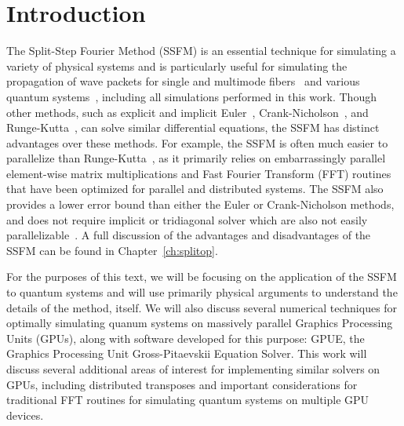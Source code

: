 \section*{Introduction}
The Split-Step Fourier Method (SSFM) is an essential technique for simulating a variety of physical systems and is particularly useful for simulating the propagation of wave packets for single and multimode fibers~\cite{agrawal2000, sinkin2003, meirelles2005, min2003} and various quantum systems~\cite{bayindir2015, weideman1986, wang2005}, including all simulations performed in this work.
Though other methods, such as explicit and implicit Euler~\cite{butcher2016}, Crank-Nicholson~\cite{crank1947}, and Runge-Kutta~\cite{butcher2016}, can solve similar differential equations, the SSFM has distinct advantages over these methods.
For example, the SSFM is often much easier to parallelize than Runge-Kutta~\cite{brehler2017}, as it primarily relies on embarrassingly parallel element-wise matrix multiplications and Fast Fourier Transform (FFT) routines that have been optimized for parallel and distributed systems.
The SSFM also provides a lower error bound than either the Euler or Crank-Nicholson methods, and does not require implicit or tridiagonal solver \cite{conte2017, thomas1949} which are also not easily parallelizable~\cite{goddeke2010, wang1981, sweet1977}.
A full discussion of the advantages and disadvantages of the SSFM can be found in Chapter~\ref{ch:splitop}.

For the purposes of this text, we will be focusing on the application of the SSFM to quantum systems and will use primarily physical arguments to understand the details of the method, itself.
We will also discuss several numerical techniques for optimally simulating quanum systems on massively parallel Graphics Processing Units (GPUs), along with software developed for this purpose: GPUE, the Graphics Processing Unit Gross-Pitaevskii Equation Solver.
This work will discuss several additional areas of interest for implementing similar solvers on GPUs, including distributed transposes and important considerations for traditional FFT routines for simulating quantum systems on multiple GPU devices.

